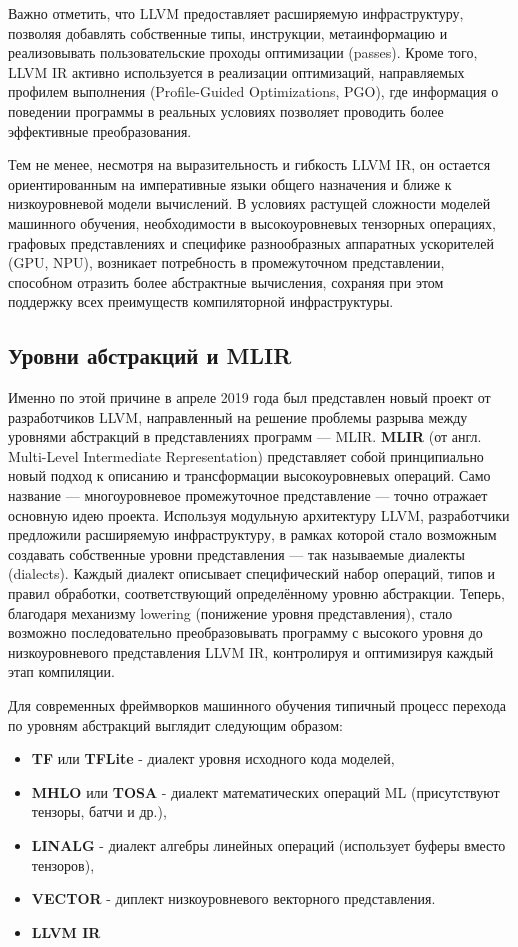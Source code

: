 Важно отметить, что LLVM предоставляет расширяемую инфраструктуру, позволяя добавлять собственные типы, инструкции, метаинформацию и реализовывать пользовательские проходы оптимизации (passes).
Кроме того, LLVM IR активно используется в реализации оптимизаций, направляемых профилем выполнения (Profile-Guided Optimizations, PGO), где информация о поведении программы в реальных условиях позволяет проводить более эффективные преобразования.

Тем не менее, несмотря на выразительность и гибкость LLVM IR, он остается ориентированным на императивные языки общего назначения и ближе к низкоуровневой модели вычислений.
В условиях растущей сложности моделей машинного обучения, необходимости в высокоуровневых тензорных операциях, графовых представлениях и специфике разнообразных аппаратных ускорителей (GPU, NPU), возникает потребность в промежуточном представлении, способном отразить более абстрактные вычисления, сохраняя при этом поддержку всех преимуществ компиляторной инфраструктуры.

\subsection{Уровни абстракций и MLIR}

Именно по этой причине в апреле 2019 года был представлен новый проект от разработчиков LLVM, направленный на решение проблемы разрыва между уровнями абстракций в представлениях программ — MLIR.
\textbf{MLIR} (от англ. Multi-Level Intermediate Representation) представляет собой принципиально новый подход к описанию и трансформации высокоуровневых операций.
Само название — многоуровневое промежуточное представление — точно отражает основную идею проекта.
Используя модульную архитектуру LLVM, разработчики предложили расширяемую инфраструктуру, в рамках которой стало возможным создавать собственные уровни представления — так называемые диалекты (dialects).
Каждый диалект описывает специфический набор операций, типов и правил обработки, соответствующий определённому уровню абстракции.
Теперь, благодаря механизму lowering (понижение уровня представления), стало возможно последовательно преобразовывать программу с высокого уровня до низкоуровневого представления LLVM IR, контролируя и оптимизируя каждый этап компиляции.

Для современных фреймворков машинного обучения типичный процесс перехода по уровням абстракций выглядит следующим образом:
\begin{itemize}
    \item \textbf{TF} или \textbf{TFLite} - диалект уровня исходного кода моделей,
    \item \textbf{MHLO} или \textbf{TOSA} - диалект математических операций ML (присутствуют тензоры, батчи и др.),
    \item \textbf{LINALG} - диалект алгебры линейных операций (использует буферы вместо тензоров),
    \item \textbf{VECTOR} - диплект низкоуровневого векторного представления.
    \item \textbf{LLVM IR}
\end{itemize}


